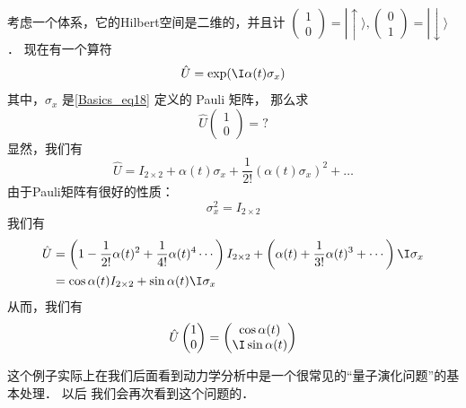 \begin{exer}{}
考虑一个体系，它的Hilbert空间是二维的，并且计 $\left(\begin{matrix}1 \\0\end{matrix}\right) = |\!\uparrow\rangle, \left(\begin{matrix}0 \\1\end{matrix}\right) = |\!\downarrow\rangle$． 现在有一个算符
\begin{equation}
\hat{U} = \exp(\I\alpha(t) \sigma_x)
\end{equation}
其中，$\sigma_x$ 是\autoref{Basics_eq18} 定义的 Pauli 矩阵， 那么求
\begin{equation}
\hat{U} \left(\begin{matrix}1 \\0\end{matrix}\right) = ? 
\end{equation}
显然，我们有
\begin{equation}
\hat U= I_{2\times2} + \alpha(t) \sigma_x + \frac{1}{2!}\left(\alpha(t) \sigma_x\right)^2 + \dots
\end{equation}
由于Pauli矩阵有很好的性质：
\begin{equation}
\sigma_x^2 = I_{2\times2}
\end{equation}
我们有
\begin{equation}
\begin{split}\hat U &= \left(1 - \frac{1}{2!}\alpha(t)^2 + \frac{1}{4!}\alpha(t)^4  \cdots\right)  I_{2\times2} + \left(\alpha(t) + \frac{1}{3!}\alpha(t)^3 + \cdots \right)\I \sigma_x\\
& = \cos\alpha(t) I_{2\times2} + \sin\alpha(t) \I\sigma_x 
\end{split}
\end{equation}
从而，我们有
\begin{equation}
\hat U \left(\begin{matrix}1 \\0\end{matrix}\right)  =  \left(\begin{matrix}\cos\alpha(t) \\ \I \sin\alpha(t)\end{matrix}\right)
\end{equation}

这个例子实际上在我们后面看到动力学分析中是一个很常见的``量子演化问题''的基本处理． 以后%
我们会再次看到这个问题的．
\end{exer}

